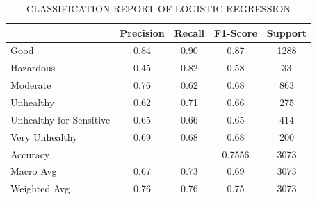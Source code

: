 \documentclass[a4paper,fleqn]{cas-dc}
\begin{document}
\begin{table}[h!]
\centering
\caption{CLASSIFICATION REPORT OF LOGISTIC REGRESSION}
\label{tab:lr_details}
\begin{tabular}{|l|c|c|c|c|}
\hline
 & \textbf{Precision} & \textbf{Recall} & \textbf{F1-Score} & \textbf{Support} \\
\hline
Good & 0.84 & 0.90 & 0.87 & 1288 \\
Hazardous & 0.45 & 0.82 & 0.58 & 33 \\
Moderate & 0.76 & 0.62 & 0.68 & 863 \\
Unhealthy & 0.62 & 0.71 & 0.66 & 275 \\
Unhealthy for Sensitive & 0.65 & 0.66 & 0.65 & 414 \\
Very Unhealthy & 0.69 & 0.68 & 0.68 & 200 \\
\hline
Accuracy &  &  & 0.7556 & 3073 \\
Macro Avg & 0.67 & 0.73 & 0.69 & 3073 \\
Weighted Avg & 0.76 & 0.76 & 0.75 & 3073 \\
\hline
\end{tabular}
\end{table}
\end{document}
